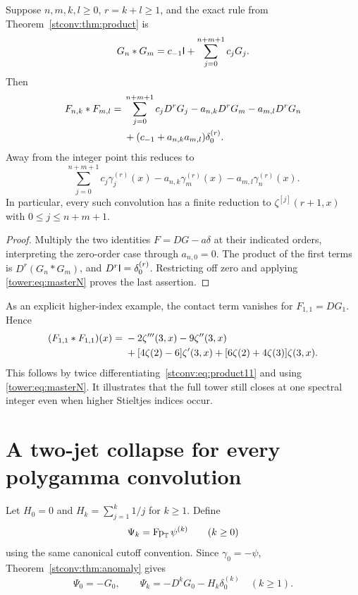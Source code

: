 \begin{corollary}
\label{stconv:cor:fulltower}
Suppose $n,m,k,l\ge0$, $r=k+l\ge1$, and the exact rule from
Theorem~\ref{stconv:thm:product} is
\[
 G_n*G_m=c_{-1}\mathsf I+\sum_{j=0}^{n+m+1}c_jG_j.
\]
Then
\begin{align}
 F_{n,k}*F_{m,l}={}&\sum_{j=0}^{n+m+1}c_jD^rG_j
             -a_{n,k}D^rG_m-a_{m,l}D^rG_n\label{stconv:eq:fulltower}\\
 &+(c_{-1}+a_{n,k}a_{m,l})\delta_0^{(r)}.\notag
\end{align}
Away from the integer point this reduces to
\[
 \sum_{j=0}^{n+m+1}c_j\gamma_j^{(r)}(x)
          -a_{n,k}\gamma_m^{(r)}(x)-a_{m,l}\gamma_n^{(r)}(x).
\]
In particular, every such convolution has a finite reduction to
$\zeta^{[j]}(r+1,x)$ with $0\le j\le n+m+1$.
\end{corollary}
\begin{proof}
Multiply the two identities $F=D G-a\delta$ at their indicated
orders, interpreting the zero-order case through $a_{n,0}=0$.
The product of the first terms is $D^r(G_n*G_m)$, and
$D^r\mathsf I=\delta_0^{(r)}$. Restricting off zero and applying
\eqref{tower:eq:masterN} proves the last assertion.
\end{proof}

As an explicit higher-index example, the contact term vanishes for
$F_{1,1}=DG_1$. Hence
\begin{align}
 (F_{1,1}*F_{1,1})(x)
 ={}&-2\zeta'''(3,x)-9\zeta''(3,x)\label{stconv:eq:gamma1primepair}\\
 &+[4\zeta(2)-6]\zeta'(3,x)
   +[6\zeta(2)+4\zeta(3)]\zeta(3,x).\notag
\end{align}
This follows by twice differentiating~\eqref{stconv:eq:product11} and using
\eqref{tower:eq:masterN}. It illustrates that the full tower still
closes at one spectral integer even when higher Stieltjes indices occur.

\section{A two-jet collapse for every polygamma convolution}
\label{stconv:sec:poly}
Let $H_0=0$ and $H_k=\sum_{j=1}^k1/j$ for $k\ge1$. Define
\[
 \Psi_k=\operatorname{Fp}_{\mathbb T}\psi^{(k)}\qquad(k\ge0)
\]
using the same canonical cutoff convention. Since $\gamma_0=-\psi$,
Theorem~\ref{stconv:thm:anomaly} gives
\begin{equation}\label{stconv:eq:PsiD}
 \Psi_0=-G_0,\qquad
 \Psi_k=-D^kG_0-H_k\delta_0^{(k)}\quad(k\ge1).
\end{equation}

